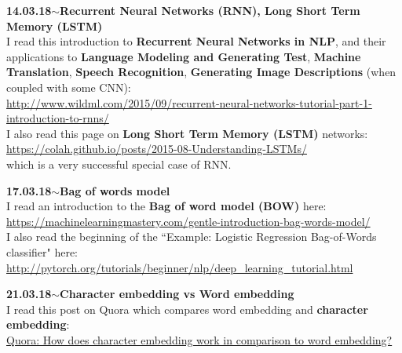 \documentclass[11pt,a4paper]{article}
\newenvironment{loggentry}[2]%
{\noindent\textbf{#1}\hspace{1cm}$\mathbf{\sim}$\text{ }\textbf{#2}\\}{\vspace{0.5cm}}
\begin{document}
\begin{loggentry}{14.03.18}{Recurrent Neural Networks (RNN), Long Short Term Memory (LSTM)}
I read this introduction to \textbf{Recurrent Neural Networks in NLP}, and their applications to \textbf{Language Modeling and Generating Test}, \textbf{Machine Translation}, \textbf{Speech Recognition}, \textbf{Generating Image Descriptions} (when coupled with some CNN):\\
\url{http://www.wildml.com/2015/09/recurrent-neural-networks-tutorial-part-1-introduction-to-rnns/}\\
I also read this page on \textbf{Long Short Term Memory (LSTM)} networks:\\
\url{https://colah.github.io/posts/2015-08-Understanding-LSTMs/}\\
which is a very successful special case of RNN.
\end{loggentry}

\begin{loggentry}{17.03.18}{Bag of words model}
I read an introduction to the \textbf{Bag of word model (BOW)} here:\\
\url{https://machinelearningmastery.com/gentle-introduction-bag-words-model/}\\
I also read the beginning of the ``Example: Logistic Regression Bag-of-Words classifier" here:\\
\url{http://pytorch.org/tutorials/beginner/nlp/deep_learning_tutorial.html}
\end{loggentry}

\begin{loggentry}{21.03.18}{Character embedding vs Word embedding}
I read this post on Quora which compares word embedding and \textbf{character embedding}:\\
\href{https://www.quora.com/How-does-character-embedding-work-in-comparison-to-word-embedding}{Quora: How does character embedding work in comparison to word embedding?}\\
\end{loggentry}
\end{document}
